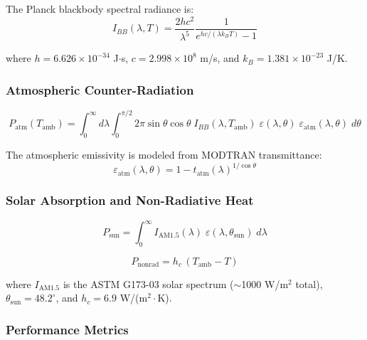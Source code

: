 The Planck blackbody spectral radiance is:
\begin{equation}
  I_{BB}(\lambda, T) = \frac{2hc^2}{\lambda^5} \frac{1}{e^{hc/(\lambda k_B T)} - 1}
  \label{eq:planck}
\end{equation}

where $h = 6.626 \times 10^{-34}$ J$\cdot$s, $c = 2.998 \times 10^{8}$ m/s, and $k_B = 1.381 \times 10^{-23}$ J/K.

\subsubsection{Atmospheric Counter-Radiation}

\begin{equation}
  P_{\text{atm}}(T_{\text{amb}}) = \int_{0}^{\infty} d\lambda \int_{0}^{\pi/2} 2\pi \sin\theta \cos\theta \; I_{BB}(\lambda, T_{\text{amb}}) \; \varepsilon(\lambda, \theta) \; \varepsilon_{\text{atm}}(\lambda, \theta) \; d\theta
  \label{eq:patm}
\end{equation}

The atmospheric emissivity is modeled from MODTRAN transmittance:
\begin{equation}
  \varepsilon_{\text{atm}}(\lambda, \theta) = 1 - t_{\text{atm}}(\lambda)^{1/\cos\theta}
  \label{eq:eps_atm}
\end{equation}

\subsubsection{Solar Absorption and Non-Radiative Heat}

\begin{equation}
  P_{\text{sun}} = \int_{0}^{\infty} I_{\text{AM1.5}}(\lambda) \; \varepsilon(\lambda, \theta_{\text{sun}}) \; d\lambda
  \label{eq:psun}
\end{equation}

\begin{equation}
  P_{\text{nonrad}} = h_c \, (T_{\text{amb}} - T)
  \label{eq:pnonrad}
\end{equation}

where $I_{\text{AM1.5}}$ is the ASTM G173-03 solar spectrum ($\sim$1000 W/m$^2$ total), $\theta_{\text{sun}} = 48.2^{\circ}$, and $h_c = 6.9$ W/(m$^2\cdot$K).

\subsubsection{Performance Metrics}

